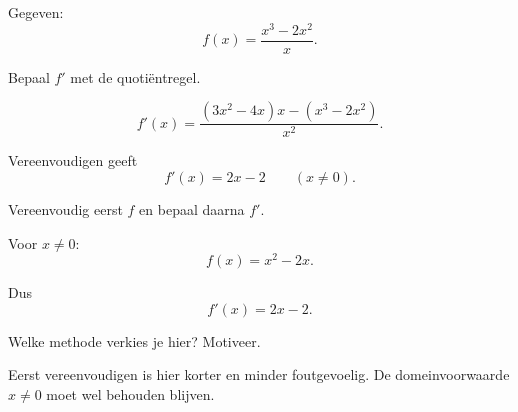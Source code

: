 \documentclass{ximera}
\begin{document}
\begin{oefening}{\oefU\ESS}

Gegeven:
\[
f(x)=\frac{x^3-2x^2}{x}.
\]

\begin{question}
Bepaal $f'$ met de quotiëntregel.

\begin{oplossing}
\[
f'(x)
=
\frac{
(3x^2-4x)x-(x^3-2x^2)
}{
x^2
}.
\]

Vereenvoudigen geeft
\[
f'(x)=2x-2
\qquad (x\neq0).
\]
\end{oplossing}
\end{question}


\begin{question}
Vereenvoudig eerst $f$ en bepaal daarna $f'$.

\begin{oplossing}
Voor $x\neq0$:
\[
f(x)=x^2-2x.
\]

Dus
\[
f'(x)=2x-2.
\]
\end{oplossing}
\end{question}


\begin{question}
Welke methode verkies je hier? Motiveer.

\begin{oplossing}
Eerst vereenvoudigen is hier korter en minder foutgevoelig.
De domeinvoorwaarde $x\neq0$ moet wel behouden blijven.
\end{oplossing}
\end{question}

\end{oefening}


\end{document}
